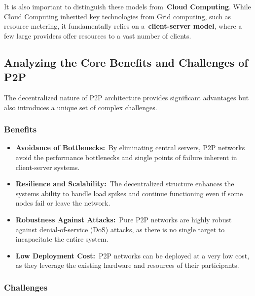 \documentclass{scrbook}
\begin{document}
It is also important to distinguish these models from~\textbf{Cloud
Computing}. While Cloud Computing inherited key technologies from Grid
computing, such as resource metering, it fundamentally relies on
a~\textbf{client-server model}, where a few large providers offer
resources to a vast number of clients.

\subsection{Analyzing the Core Benefits and Challenges of
P2P}\label{analyzing-the-core-benefits-and-challenges-of-p2p}

The decentralized nature of P2P architecture provides significant
advantages but also introduces a unique set of complex challenges.

\subsubsection{Benefits}

\begin{itemize}
\item
  \textbf{Avoidance of Bottlenecks:}~By eliminating central servers, P2P
  networks avoid the performance bottlenecks and single points of
  failure inherent in client-server systems.
\item
  \textbf{Resilience and Scalability:}~The decentralized structure
  enhances the system\textquotesingle s ability to handle load spikes
  and continue functioning even if some nodes fail or leave the network.
\item
  \textbf{Robustness Against Attacks:}~Pure P2P networks are highly
  robust against denial-of-service (DoS) attacks, as there is no single
  target to incapacitate the entire system.
\item
  \textbf{Low Deployment Cost:}~P2P networks can be deployed at a very
  low cost, as they leverage the existing hardware and resources of
  their participants.
\end{itemize}

\subsubsection{Challenges}
\end{document}
